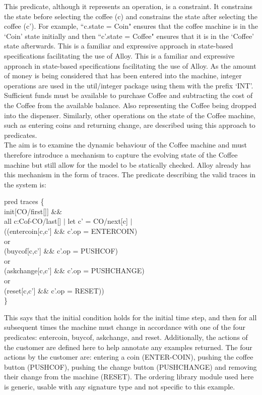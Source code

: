\documentclass[a4paper,12pt]{extarticle}
\begin{document}
This predicate, although it represents an operation, is a constraint. It constrains the state before selecting the coffee (c) and constrains the state after selecting the coffee (c'). For example, ``c.state = Coin" ensures that the coffee machine is in the `Coin’ state initially and then ``c'.state = Coffee" ensures that it is in the `Coffee' state afterwards. This is a familiar and expressive approach in state-based specifications facilitating the use of Alloy. This is a familiar and expressive approach in state-based specifications facilitating the use of Alloy. As the amount of money is being considered that has been entered into the machine, integer operations are used in the util/integer package using them with the prefix `INT’. Sufficient funds must be available to purchase Coffee and subtracting the cost of the Coffee from the available balance. Also representing the Coffee being dropped into the dispenser. Similarly, other operations on the state of the Coffee machine, such as entering coins and returning change, are described using this approach to predicates.\\

The aim is to examine the dynamic behaviour of the Coffee machine and must therefore introduce a mechanism to capture the evolving state of the Coffee machine but still allow for the model to be statically checked. Alloy already has this mechanism in the form of traces. The predicate describing the valid traces in the system is:\\
\begin{algorithm}
pred traces \{ \\
init[CO/first[]] \&\& \\
all c:Cof-CO/last[] $|$ let c' = CO/next[c] $|$ \\
((entercoin[c,c'] \&\& c'.op = ENTERCOIN)\\
or\\
(buycof[c,c'] \&\& c'.op = PUSHCOF)\\
or\\
(askchange[c,c'] \&\& c'.op = PUSHCHANGE)\\
or\\
(reset[c,c'] \&\& c'.op = RESET))\\
\}\\
\end{algorithm}

This says that the initial condition holds for the initial time step, and then for all subsequent times the machine must change in accordance with one of the four predicates: entercoin, buycof, askchange, and reset. Additionally, the actions of the customer are defined here to help annotate any examples returned. The four actions by the customer are: entering a coin (ENTER-COIN), pushing the coffee button (PUSHCOF), pushing the change button (PUSHCHANGE) and removing their change from the machine (RESET). The ordering library module used here is generic, usable with any signature type and not specific to this example.\\
\end{document}

